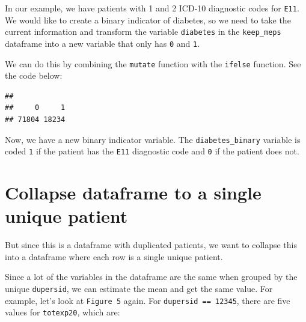 \documentclass[
]{book}
\newenvironment{Shaded}{\begin{snugshade}}{\end{snugshade}}
\newcommand{\AttributeTok}[1]{\textcolor[rgb]{0.77,0.63,0.00}{#1}}
\newcommand{\ConstantTok}[1]{\textcolor[rgb]{0.00,0.00,0.00}{#1}}
\newcommand{\DecValTok}[1]{\textcolor[rgb]{0.00,0.00,0.81}{#1}}
\newcommand{\FunctionTok}[1]{\textcolor[rgb]{0.00,0.00,0.00}{#1}}
\newcommand{\NormalTok}[1]{#1}
\newcommand{\OtherTok}[1]{\textcolor[rgb]{0.56,0.35,0.01}{#1}}
\newcommand{\SpecialCharTok}[1]{\textcolor[rgb]{0.00,0.00,0.00}{#1}}
\begin{document}
In our example, we have patients with 1 and 2 ICD-10 diagnostic codes for \texttt{E11}. We would like to create a binary indicator of diabetes, so we need to take the current information and transform the variable \texttt{diabetes} in the \texttt{keep\_meps} dataframe into a new variable that only has \texttt{0} and \texttt{1}.

We can do this by combining the \texttt{mutate} function with the \texttt{ifelse} function. See the code below:

\begin{Shaded}
\end{Shaded}

\begin{verbatim}
## 
##     0     1 
## 71804 18234
\end{verbatim}

Now, we have a new binary indicator variable. The \texttt{diabetes\_binary} variable is coded \texttt{1} if the patient has the \texttt{E11} diagnostic code and \texttt{0} if the patient does not.

\hypertarget{collapse-dataframe-to-a-single-unique-patient}{%
\section{Collapse dataframe to a single unique patient}\label{collapse-dataframe-to-a-single-unique-patient}}

But since this is a dataframe with duplicated patients, we want to collapse this into a dataframe where each row is a single unique patient.

Since a lot of the variables in the dataframe are the same when grouped by the unique \texttt{dupersid}, we can estimate the mean and get the same value. For example, let's look at \texttt{Figure\ 5} again. For \texttt{dupersid\ ==\ 12345}, there are five values for \texttt{totexp20}, which are:
\end{document}
